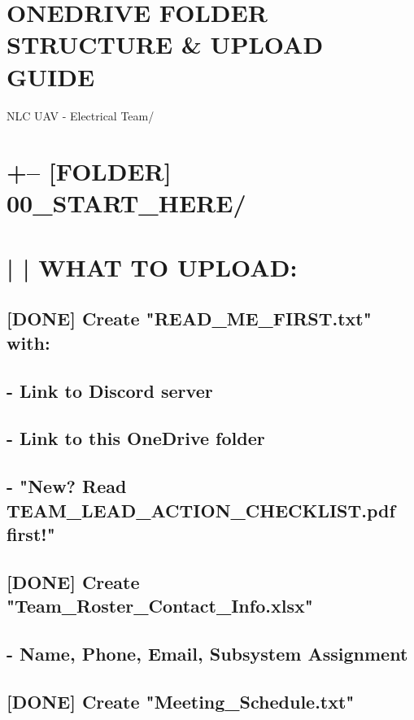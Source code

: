 \documentclass[11pt,letterpaper]{article}
\begin{document}
\section{ONEDRIVE FOLDER STRUCTURE \& UPLOAD GUIDE}

NLC UAV - Electrical Team/\par

\section{+-- [FOLDER] 00\_START\_HERE/}

\section{|   |   WHAT TO UPLOAD:}

\subsection*{[DONE] Create "READ\_ME\_FIRST.txt" with:}

\subsection*{- Link to Discord server}

\subsection*{- Link to this OneDrive folder}

\subsection*{- "New? Read TEAM\_LEAD\_ACTION\_CHECKLIST.pdf first!"}

\subsection*{[DONE] Create "Team\_Roster\_Contact\_Info.xlsx"}

\subsection*{- Name, Phone, Email, Subsystem Assignment}

\subsection*{[DONE] Create "Meeting\_Schedule.txt"}
\end{document}
